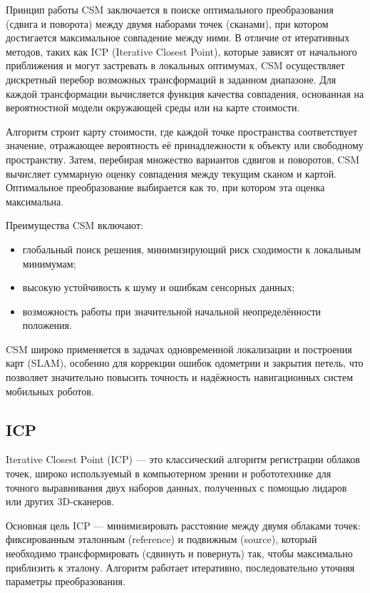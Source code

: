 Принцип работы CSM заключается в поиске оптимального преобразования (сдвига и поворота) между двумя наборами точек (сканами), при котором достигается максимальное совпадение между ними. В отличие от итеративных методов, таких как ICP (Iterative Closest Point), которые зависят от начального приближения и могут застревать в локальных оптимумах, CSM осуществляет дискретный перебор возможных трансформаций в заданном диапазоне. Для каждой трансформации вычисляется функция качества совпадения, основанная на вероятностной модели окружающей среды или на карте стоимости.

Алгоритм строит карту стоимости, где каждой точке пространства соответствует значение, отражающее вероятность её принадлежности к объекту или свободному пространству. Затем, перебирая множество вариантов сдвигов и поворотов, CSM вычисляет суммарную оценку совпадения между текущим сканом и картой. Оптимальное преобразование выбирается как то, при котором эта оценка максимальна.

Преимущества CSM включают:
\begin{itemize}
	\item глобальный поиск решения, минимизирующий риск сходимости к локальным минимумам;
	\item высокую устойчивость к шуму и ошибкам сенсорных данных;
	\item возможность работы при значительной начальной неопределённости положения.
\end{itemize}

CSM широко применяется в задачах одновременной локализации и построения карт (SLAM), особенно для коррекции ошибок одометрии и закрытия петель, что позволяет значительно повысить точность и надёжность навигационных систем мобильных роботов.

\subsection{ICP}

Iterative Closest Point (ICP) — это классический алгоритм регистрации облаков точек, широко используемый в компьютерном зрении и робототехнике для точного выравнивания двух наборов данных, полученных с помощью лидаров или других 3D-сканеров.

Основная цель ICP — минимизировать расстояние между двумя облаками точек: фиксированным эталонным (reference) и подвижным (source), который необходимо трансформировать (сдвинуть и повернуть) так, чтобы максимально приблизить к эталону. Алгоритм работает итеративно, последовательно уточняя параметры преобразования.

